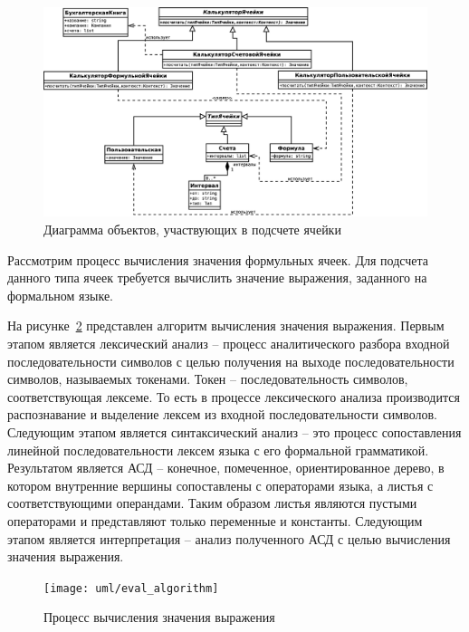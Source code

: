 \documentclass[14pt,a4paper]{reportmod}
\begin{document}
\begin{figure}
  \centering
  \includegraphics[scale=0.4]{uml/_classes_2}
  \caption{Диаграмма объектов, участвующих в подсчете ячейки}
  \label{pic:classes_2}
\end{figure}

Рассмотрим процесс вычисления значения формульных ячеек. Для подсчета данного типа ячеек требуется вычислить значение выражения, заданного на формальном языке.

На рисунке~\ref{pic:evalprocess} представлен алгоритм вычисления значения выражения. Первым этапом является лексический анализ -- процесс аналитического разбора входной последовательности символов  с целью получения на выходе последовательности символов, называемых токенами. Токен -- последовательность символов, соответствующая лексеме. То есть в процессе лексического анализа производится распознавание и выделение лексем из входной последовательности символов. Следующим этапом является синтаксический анализ --  это процесс сопоставления линейной последовательности лексем языка с его формальной грамматикой. Результатом является АСД -- конечное, помеченное, ориентированное дерево, в котором внутренние вершины сопоставлены с операторами языка, а листья с соответствующими операндами. Таким образом листья являются пустыми операторами и представляют только переменные и константы. Следующим этапом является интерпретация -- анализ полученного АСД с целью вычисления значения выражения.

\begin{figure}[ht]
  \centering
  \texttt{[image: uml/eval\_algorithm]}
  \caption{Процесс вычисления значения выражения}
  \label{pic:evalprocess}
\end{figure}
\end{document}
